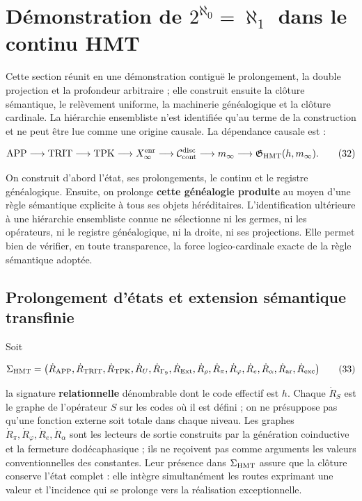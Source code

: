 \section{Démonstration de \texorpdfstring{\(2^{\aleph_0}=\aleph_1\)}{2 élevé à aleph zéro égal à aleph un} dans le continu HMT}
\label{sec:cierre-cardinal-nativo}

Cette section réunit en une démonstration contiguë le prolongement, la double projection et la profondeur arbitraire ; elle construit ensuite la clôture sémantique, le relèvement uniforme, la machinerie généalogique et la clôture cardinale. La hiérarchie ensembliste n'est identifiée qu'au terme de la construction et ne peut être lue comme une origine causale. La dépendance causale est :

\[
 \mathrm{APP}\longrightarrow\mathrm{TRIT}\longrightarrow\mathrm{TPK}
 \longrightarrow X_\infty^{\rm enr}
 \longrightarrow\mathcal C_{\rm cont}^{\rm disc}
 \longrightarrow m_\infty
 \longrightarrow\mathfrak G_{\rm HMT}(h,m_\infty).
\tag{32}\label{eq:ch-cadena-causal}
\]

On construit d’abord l’état, ses prolongements, le continu et le registre généalogique.
Ensuite, on prolonge \textbf{cette généalogie produite} au moyen d’une règle sémantique
explicite à tous ses objets héréditaires. L’identification ultérieure à
une hiérarchie ensembliste connue ne sélectionne ni les germes, ni les opérateurs,
ni le registre généalogique, ni la droite, ni ses projections. Elle permet bien de vérifier, en toute
transparence, la force logico-cardinale exacte de la règle sémantique adoptée.

\subsection{Prolongement d’états et extension sémantique transfinie}

Soit

\[
 \Sigma_{\rm HMT}
 =\bigl(\dot R_{\rm APP},\dot R_{\rm TRIT},\dot R_{\rm TPK},
 \dot R_{U},\dot R_{\Gamma_9},\dot R_{\rm Ext},\dot R_\rho,
 \dot R_{\pi},\dot R_{\varphi},\dot R_e,\dot R_{\alpha},
 \dot R_{\rm ar},\dot R_{\rm exc}\bigr)
\tag{33}\label{eq:ch-signatura}
\]

la signature \textbf{relationnelle} dénombrable dont le code effectif est \(h\). Chaque \(\dot R_S\) est le graphe de l'opérateur \(S\) sur les codes où il est défini ; on ne présuppose pas qu'une fonction externe soit totale dans chaque niveau. Les graphes \(\dot R_{\pi},\dot R_{\varphi},\dot R_e,\dot R_{\alpha}\) sont les lecteurs de sortie construits par la génération coinductive et la fermeture dodécaphasique ; ils ne reçoivent pas comme arguments les valeurs conventionnelles des constantes. Leur présence dans \(\Sigma_{\rm HMT}\) assure que la clôture conserve l'état complet : elle intègre simultanément les routes exprimant une valeur et l'incidence qui se prolonge vers la réalisation exceptionnelle.

